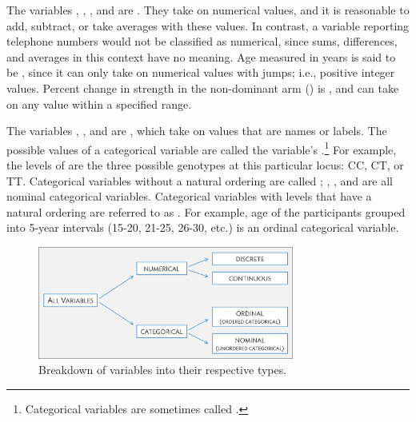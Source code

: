 
The variables , , , and  are . They take on numerical values, and it is reasonable to add, subtract, or take averages with these values. In contrast, a variable reporting telephone numbers would not be classified as numerical, since sums, differences, and averages in this context have no meaning. Age measured in years is said to be , since it can only take on numerical values with jumps; i.e., positive integer values. Percent change in strength in the non-dominant arm () is , and can take on any value within a specified range.


The variables , , and  are , which take on values that are names or labels. The possible values of a categorical variable are called the variable's .\footnote{Categorical variables are sometimes called .}  For example, the levels of  are the three possible genotypes at this particular locus: CC, CT, or TT.  Categorical variables without a natural ordering are called ; , , and  are all nominal categorical variables. Categorical variables with levels that have a natural ordering are referred to as . For example, age of the participants grouped into 5-year intervals (15-20, 21-25, 26-30, etc.) is an ordinal categorical variable.  

\begin{figure}
\centering
\includegraphics[width=0.75\textwidth]{ch_01a_intro_to_data_oi_biostat/figures/variables/variableTypes.png}
\caption{Breakdown of variables into their respective types.}
\label{variableTypesFig}
\end{figure}

